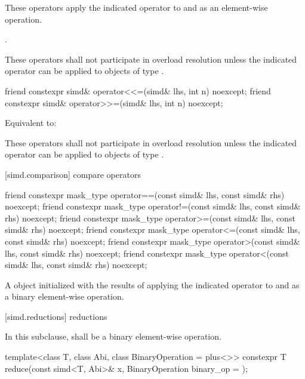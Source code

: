 \begin{itemdescr}
  \pnum\effects
  These operators apply the indicated operator to  and  as an element-wise operation.

  \pnum\returns
  .

  \pnum\remarks
  These operators shall not participate in overload resolution unless the indicated operator can be applied to objects of type .
\end{itemdescr}

\begin{itemdecl}
friend constexpr simd& operator<<=(simd& lhs, int n) noexcept;
friend constexpr simd& operator>>=(simd& lhs, int n) noexcept;
\end{itemdecl}

\begin{itemdescr}
  \pnum\effects
  Equivalent to: 

  \pnum\remarks
  These operators shall not participate in overload resolution unless the indicated operator can be applied to objects of type .
\end{itemdescr}

[simd.comparison]{ compare operators}

\begin{itemdecl}
friend constexpr mask_type operator==(const simd& lhs, const simd& rhs) noexcept;
friend constexpr mask_type operator!=(const simd& lhs, const simd& rhs) noexcept;
friend constexpr mask_type operator>=(const simd& lhs, const simd& rhs) noexcept;
friend constexpr mask_type operator<=(const simd& lhs, const simd& rhs) noexcept;
friend constexpr mask_type operator>(const simd& lhs, const simd& rhs) noexcept;
friend constexpr mask_type operator<(const simd& lhs, const simd& rhs) noexcept;
\end{itemdecl}

\begin{itemdescr}
  \pnum\returns
  A  object initialized with the results of applying the indicated operator to  and  as a binary element-wise operation.
\end{itemdescr}

[simd.reductions]{\texorpdfstring{ r}{simd r}eductions}

\pnum
In this subclause,  shall be a binary element-wise operation.

\begin{itemdecl}
template<class T, class Abi, class BinaryOperation = plus<>>
  constexpr T reduce(const simd<T, Abi>& x, BinaryOperation binary_op = {});
\end{itemdecl}

